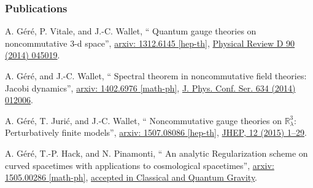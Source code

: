 \documentclass[9pt]{beamer}
\newcommand\paper[1]{\def\insertpaper{#1}}
\renewcommand{\paper}[6]{#1, ``#2'', \href{#4}{arxiv: #3}, \href{http://dx.doi.org/#6}{#5}.}
\begin{document}
\begin{frame}

\frametitle{Publications}

\begin{exampleblock}{\vspace*{-3ex}}
\vspace*{-5pt}

\paper{%
A. Géré, P. Vitale, and J.-C. Wallet}{%
Quantum gauge theories on noncommutative 3-d space}{%
1312.6145 [hep-th]}{%
http://arxiv.org/abs/1312.6145}{%
Physical Review D 90 (2014) 045019}{%
10.1103/PhysRevD.90.045019}\par%

\paper{%
A. Géré, and J.-C. Wallet}{%
Spectral theorem in noncommutative field theories: Jacobi dynamics}{%
1402.6976 [math-ph]}{%
http://arxiv.org/abs/1402.6976}{%
J. Phys. Conf. Ser. 634 (2014) 012006}{%
10.1088/1742-6596/634/1/012006}\par%

\paper{%
A. Géré, T. Jurić, and J.-C. Wallet}{%
Noncommutative gauge theories on $\mathbb{R}^3_\lambda$: Perturbatively finite models}{%
1507.08086 [hep-th]}{%
http://arxiv.org/abs/1507.08086}{%
JHEP, 12 (2015) 1--29}{%
10.1007/JHEP12(2015)045}\par%

\end{exampleblock}

\begin{block}{\vspace*{-3ex}}
\vspace*{-5pt}

\paper{%
A. Géré, T.-P. Hack, and N. Pinamonti}{%
An analytic Regularization scheme on curved spacetimes with applications to cosmological spacetimes}{%
1505.00286 [math-ph]}{%
http://arxiv.org/abs/1505.00286}{%
accepted in Classical and Quantum Gravity}{%
http://iopscience.iop.org/0264-9381/}%

\end{block}

\end{frame}

\end{document}
